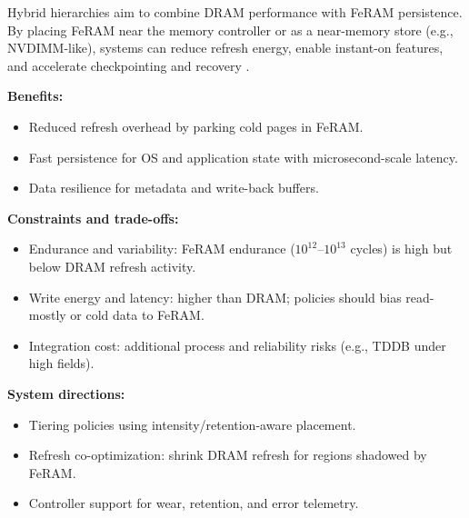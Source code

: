 Hybrid hierarchies aim to combine DRAM performance with FeRAM persistence. By placing FeRAM near the memory controller or as a near-memory store (e.g., NVDIMM-like), systems can reduce refresh energy, enable instant-on features, and accelerate checkpointing and recovery \cite{noheda2023,martin2020}.

\textbf{Benefits:}
\begin{itemize}
  \item Reduced refresh overhead by parking cold pages in FeRAM.
  \item Fast persistence for OS and application state with microsecond-scale latency.
  \item Data resilience for metadata and write-back buffers.
\end{itemize}

\textbf{Constraints and trade-offs:}
\begin{itemize}
  \item Endurance and variability: FeRAM endurance ($10^{12}$--$10^{13}$ cycles) is high but below DRAM refresh activity.
  \item Write energy and latency: higher than DRAM; policies should bias read-mostly or cold data to FeRAM.
  \item Integration cost: additional process and reliability risks (e.g., TDDB under high fields).
\end{itemize}

\textbf{System directions:}
\begin{itemize}
  \item Tiering policies using intensity/retention-aware placement.
  \item Refresh co-optimization: shrink DRAM refresh for regions shadowed by FeRAM.
  \item Controller support for wear, retention, and error telemetry.
\end{itemize}
